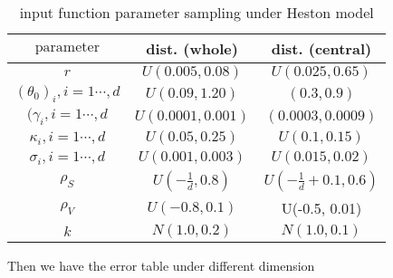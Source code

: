 \documentclass[11pt,a4paper]{article}
\theoremstyle{remark}
\begin{document}
	
	\begin{table}[H]
		\centering
		\caption{input function parameter sampling under Heston model}
		\begin{tabular}{ccc}
			\hline
			$\text{parameter}$    &   dist. (whole) & dist. (central) \\
			\hline
			$r$   & $U(0.005, 0.08)$  &  $U(0.025, 0.65)$\\
			$(\theta_0)_i, i=1\cdots,d$   & $U(0.09, 1.20)$ & $(0.3, 0.9)$\\
			$(\gamma_i, i=1\cdots,d$   & $U(0.0001, 0.001)$ & $(0.0003, 0.0009)$\\
			$\kappa_i, i=1\cdots,d$  & $U(0.05, 0.25)$ & $U(0.1, 0.15)$\\
			$\sigma_i, i=1\cdots,d$  & $U(0.001, 0.003)$ & $U(0.015, 0.02)$\\
			$\rho_S$  & $U(-\frac{1}{d}, 0.8)$ & $U(-\frac{1}{d}+0.1, 0.6)$  \\
			$\rho_V$  & $U(-0.8, 0.1)$  & U(-0.5, 0.01) \\
			$\textit{k}$ & $N(1.0, 0.2)$ & $N(1.0, 0.1)$\\
			\hline
			
		\end{tabular}%
		\label{tab:dists}%
	\end{table}%
	Then we have the error table under different dimension
	
\end{document}
